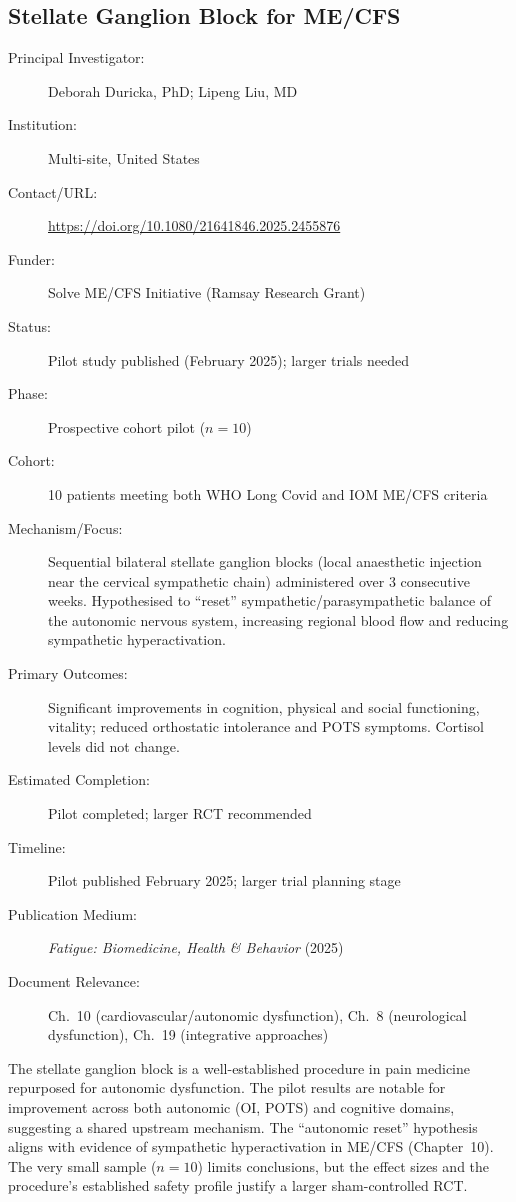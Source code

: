 \subsection{Stellate Ganglion Block for ME/CFS}
\label{sec:registry-sgb}

\begin{description}
    \item[Principal Investigator:] Deborah Duricka, PhD; Lipeng Liu, MD
    \item[Institution:] Multi-site, United States
    \item[Contact/URL:] \url{https://doi.org/10.1080/21641846.2025.2455876}
    \item[Funder:] Solve ME/CFS Initiative (Ramsay Research Grant)
    \item[Status:] Pilot study published (February 2025); larger trials needed
    \item[Phase:] Prospective cohort pilot ($n=10$)
    \item[Cohort:] 10 patients meeting both WHO Long Covid and IOM ME/CFS
        criteria
    \item[Mechanism/Focus:] Sequential bilateral stellate ganglion blocks
        (local anaesthetic injection near the cervical sympathetic chain)
        administered over 3 consecutive weeks.  Hypothesised to ``reset''
        sympathetic/parasympathetic balance of the autonomic nervous system,
        increasing regional blood flow and reducing sympathetic hyperactivation.
    \item[Primary Outcomes:] Significant improvements in cognition, physical
        and social functioning, vitality; reduced orthostatic intolerance
        and POTS symptoms.  Cortisol levels did not change.
    \item[Estimated Completion:] Pilot completed; larger RCT recommended
    \item[Timeline:] Pilot published February 2025; larger trial planning
        stage
    \item[Publication Medium:] \textit{Fatigue: Biomedicine, Health \&
        Behavior} (2025)
    \item[Document Relevance:] Ch.~10 (cardiovascular/autonomic dysfunction),
        Ch.~8 (neurological dysfunction), Ch.~19 (integrative approaches)
\end{description}

The stellate ganglion block is a well-established procedure in pain medicine
repurposed for autonomic dysfunction.  The pilot results are notable for
improvement across both autonomic (OI, POTS) and cognitive domains,
suggesting a shared upstream mechanism.  The ``autonomic reset'' hypothesis
aligns with evidence of sympathetic hyperactivation in ME/CFS (Chapter~10).
The very small sample ($n=10$) limits conclusions, but the effect sizes and
the procedure's established safety profile justify a larger sham-controlled
RCT.

